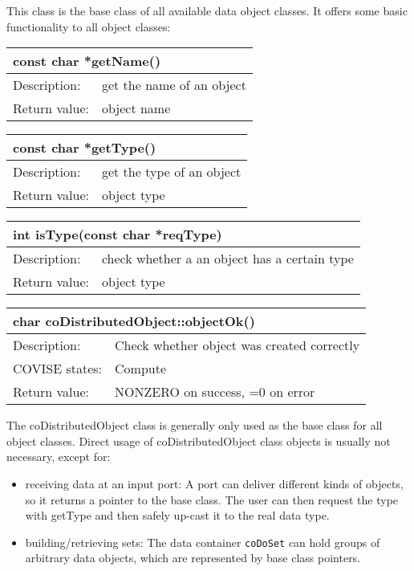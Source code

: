This class is the base class of all available data object classes. It offers 
some basic functionality to all object classes:

\begin{longtable}{|p{4cm}|p{10cm}|}
\hline
\multicolumn{2}{|p{13.5cm}|}{\bf const char *getName()} \\
\hline
{Description:}   
              & {get the name of an object} \\
\hline
{Return value:}  & {object name} \endhead
\hline
\end{longtable}

\begin{longtable}{|p{4cm}|p{10cm}|}
\hline
\multicolumn{2}{|p{13.5cm}|}{\bf const char *getType()} \\
\hline
{Description:}   
              & {get the type of an object} \\
\hline
{Return value:}  & {object type} \endhead
\hline
\end{longtable}

\begin{longtable}{|p{4cm}|p{10cm}|}
\hline
\multicolumn{2}{|p{13.5cm}|}{\bf int isType(const char *reqType)} \\
\hline
{Description:}   
            & {check whether a an object has a certain type} \\
\hline
{Return value:}  & {object type} \endhead
\hline
\end{longtable}

\begin{longtable}{|p{4cm}|p{10cm}|}
\hline
\multicolumn{2}{|p{13.5cm}|}{\bf char coDistributedObject::objectOk()} \\
\hline
{Description:}   
          & {Check whether object was created correctly} \\
\hline
{COVISE states:} & {Compute} \\
\hline
{Return value:}  
                    & {NONZERO on success, =0 on error} \endhead
\hline
\end{longtable}

The coDistributedObject class is generally only used as the base class for all 
object classes. Direct usage of coDistributedObject class objects is usually
not necessary, except for:

\begin{itemize}
\item receiving data at an input port: A port can deliver different kinds of 
objects, so it returns a pointer to the base class. The user can then request 
the type with getType and then safely up-cast it to the real data type.
\item building/retrieving sets: The data container {\tt coDoSet} can hold 
groups of arbitrary data objects, which are represented by base class pointers. 
\end{itemize}


